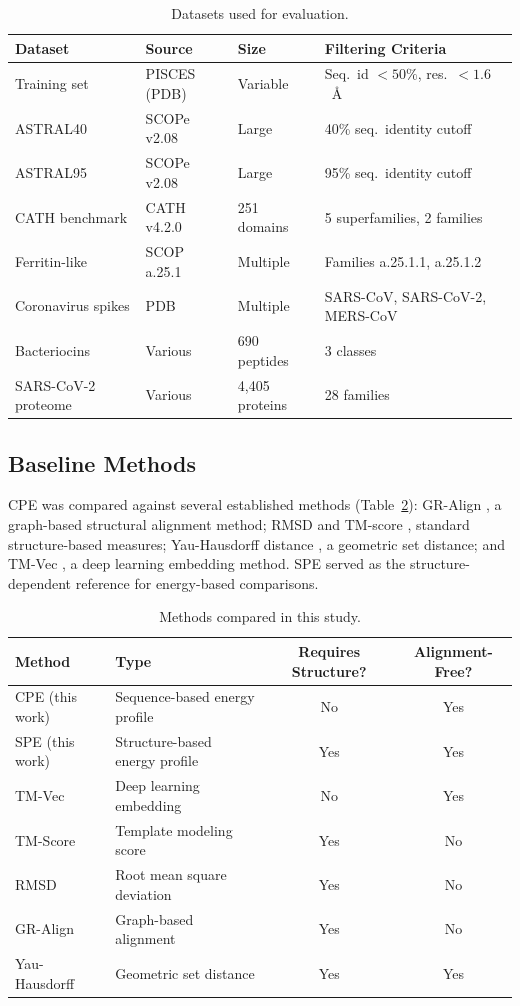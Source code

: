 \documentclass[11pt]{article}
\begin{document}
\begin{table}[htbp]
\centering
\caption{Datasets used for evaluation.}
\label{tab:datasets}
\begin{tabular}{llll}
\toprule
\textbf{Dataset} & \textbf{Source} & \textbf{Size} & \textbf{Filtering Criteria} \\
\midrule
Training set & PISCES (PDB) & Variable & Seq.\ id $<50\%$, res.\ $<1.6$~\AA \\
ASTRAL40 & SCOPe v2.08 & Large & 40\% seq.\ identity cutoff \\
ASTRAL95 & SCOPe v2.08 & Large & 95\% seq.\ identity cutoff \\
CATH benchmark & CATH v4.2.0 & 251 domains & 5 superfamilies, 2 families \\
Ferritin-like & SCOP a.25.1 & Multiple & Families a.25.1.1, a.25.1.2 \\
Coronavirus spikes & PDB & Multiple & SARS-CoV, SARS-CoV-2, MERS-CoV \\
Bacteriocins & Various & 690 peptides & 3 classes \\
SARS-CoV-2 proteome & Various & 4,405 proteins & 28 families \\
\bottomrule
\end{tabular}
\end{table}

\subsection{Baseline Methods}

CPE was compared against several established methods (Table~\ref{tab:methods}): GR-Align \citep{menke2008}, a graph-based structural alignment method; RMSD and TM-score \citep{zhang2005}, standard structure-based measures; Yau-Hausdorff distance \citep{yau2012}, a geometric set distance; and TM-Vec \citep{hammad2023}, a deep learning embedding method. SPE served as the structure-dependent reference for energy-based comparisons.

\begin{table}[htbp]
\centering
\caption{Methods compared in this study.}
\label{tab:methods}
\begin{tabular}{llcc}
\toprule
\textbf{Method} & \textbf{Type} & \textbf{Requires Structure?} & \textbf{Alignment-Free?} \\
\midrule
CPE (this work) & Sequence-based energy profile & No & Yes \\
SPE (this work) & Structure-based energy profile & Yes & Yes \\
TM-Vec & Deep learning embedding & No & Yes \\
TM-Score & Template modeling score & Yes & No \\
RMSD & Root mean square deviation & Yes & No \\
GR-Align & Graph-based alignment & Yes & No \\
Yau-Hausdorff & Geometric set distance & Yes & Yes \\
\bottomrule
\end{tabular}
\end{table}
\end{document}

